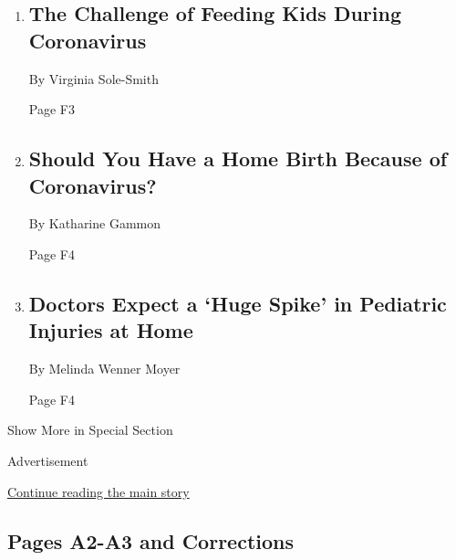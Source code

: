 \begin{enumerate}
\def\labelenumi{\arabic{enumi}.}
\item
  \href{/2020/03/26/parenting/coronavirus-kids-cooking.html}{}

  \hypertarget{the-challenge-of-feeding-kids-during-coronavirus}{%
  \subsection{The Challenge of Feeding Kids During
  Coronavirus}\label{the-challenge-of-feeding-kids-during-coronavirus}}

  By Virginia Sole-Smith

  Page F3
\item
  \href{/2020/03/30/parenting/home-birth-coronavirus-hospital.html}{}

  \hypertarget{should-you-have-a-home-birth-because-of-coronavirus}{%
  \subsection{Should You Have a Home Birth Because of
  Coronavirus?}\label{should-you-have-a-home-birth-because-of-coronavirus}}

  By Katharine Gammon

  Page F4
\item
  \href{/2020/03/26/parenting/kids-injuries-coronavirus.html}{}

  \hypertarget{doctors-expect-a-huge-spike-in-pediatric-injuries-at-home}{%
  \subsection{Doctors Expect a `Huge Spike' in Pediatric Injuries at
  Home}\label{doctors-expect-a-huge-spike-in-pediatric-injuries-at-home}}

  By Melinda Wenner Moyer

  Page F4
\end{enumerate}

Show More in Special Section

Advertisement

\protect\hyperlink{after-mid9}{Continue reading the main story}

\hypertarget{pages-a2-a3-and-corrections}{%
\subsection{Pages A2-A3 and
Corrections}\label{pages-a2-a3-and-corrections}}

